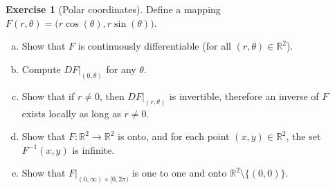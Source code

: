\documentclass[12pt,openany]{book}
\newcommand{\R}{{\mathbb{R}}}
\theoremstyle{plain}
\theoremstyle{remark}
\theoremstyle{definition}
\newenvironment{exbox}{%
    \def\FrameCommand{\vrule width 1pt \relax\hspace{10pt}}%
    \MakeFramed{\advance\hsize-\width\FrameRestore}%
}{%
    \endMakeFramed
}
\newenvironment{exparts}{%
    \leavevmode\begin{enumerate}[a),noitemsep,topsep=0pt,parsep=0pt,partopsep=0pt]
}{%
    \end{enumerate}
}
\theoremstyle{exercise}
\newtheorem{exercise}{Exercise}[section]
\theoremstyle{example}
\begin{document}
\begin{exbox}
\begin{exercise}[Polar coordinates] \label{mv:exercise:polarcoordinates}
Define a mapping $F(r,\theta) = \bigl(r \cos(\theta), r \sin(\theta) \bigr)$.
\begin{exparts}
\item
Show that $F$ is continuously differentiable (for all $(r,\theta) \in
\R^2$).
\item
Compute $DF|_{(0,\theta)}$ for any $\theta$.
\item
Show that if $r \not= 0$, then $DF|_{(r,\theta)}$ is invertible, therefore an
inverse of $F$ exists locally as long as $r \not= 0$.
\item
Show that $F \colon \R^2 \to \R^2$ is onto, and for each point $(x,y) \in
\R^2$, the set $F^{-1}(x,y)$ is infinite.
\item
Show that $F|_{(0,\infty) \times [0,2\pi)}$ is one to one and onto
$\R^2 \setminus \bigl\{ (0,0) \bigr\}$.
\end{exparts}
\end{exercise}
\end{exbox}


\def\myDOI#1{\href{http://dx.doi.org/#1}{#1}}
\end{document}
